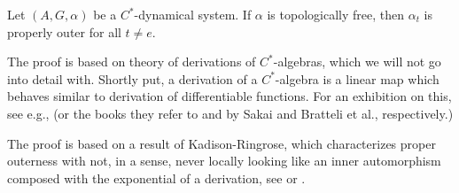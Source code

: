 \begin{proposition}
	Let $(A,G,\alpha)$ be a $C^*$-dynamical system. If $\alpha$ is topologically free, then $\alpha_t$ is properly outer for all $t \neq e$.
\end{proposition}
\begin{remark}
	The proof is based on theory of derivations of $C^*$-algebras, which we will not go into detail with. Shortly put, a derivation of a $C^*$-algebra is a linear map which behaves similar to derivation of differentiable functions. For an exhibition on this, see e.g., \cite[Chapter 8.6]{pedersenalgauto} (or the books they refer to \cite{sakai1978recent} and \cite{bratteli2012operator} by Sakai and Bratteli et al., respectively.) 

	The proof is based on a result of Kadison-Ringrose, which characterizes proper outerness with not, in a sense, never locally looking like an inner automorphism composed with the exponential of a derivation, see \cite{kadison1967derivations} or \cite[Theorem 6.6 (i) and (ii)]{olesenpedersen3}.
\end{remark}

